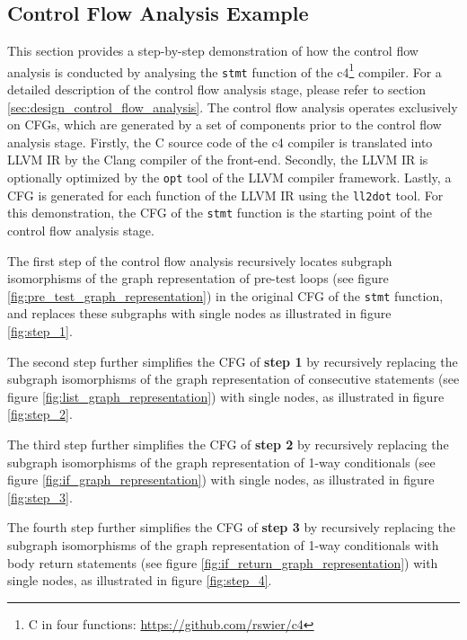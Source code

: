 
\subsection{Control Flow Analysis Example}
\label{app:control_flow_analysis_example}

This section provides a step-by-step demonstration of how the control flow analysis is conducted by analysing the \texttt{stmt} function of the c4\footnote{C in four functions: \url{https://github.com/rswier/c4}} compiler. For a detailed description of the control flow analysis stage, please refer to section \ref{sec:design_control_flow_analysis}. The control flow analysis operates exclusively on CFGs, which are generated by a set of components prior to the control flow analysis stage. Firstly, the C source code of the c4 compiler is translated into LLVM IR by the Clang compiler of the front-end. Secondly, the LLVM IR is optionally optimized by the \texttt{opt} tool of the LLVM compiler framework. Lastly, a CFG is generated for each function of the LLVM IR using the \texttt{ll2dot} tool. For this demonstration, the CFG of the \texttt{stmt} function is the starting point of the control flow analysis stage.

The first step of the control flow analysis recursively locates subgraph isomorphisms of the graph representation of pre-test loops (see figure \ref{fig:pre_test_graph_representation}) in the original CFG of the \texttt{stmt} function, and replaces these subgraphs with single nodes as illustrated in figure \ref{fig:step_1}.

The second step further simplifies the CFG of \textbf{step 1} by recursively replacing the subgraph isomorphisms of the graph representation of consecutive statements (see figure \ref{fig:list_graph_representation}) with single nodes, as illustrated in figure \ref{fig:step_2}.

The third step further simplifies the CFG of \textbf{step 2} by recursively replacing the subgraph isomorphisms of the graph representation of 1-way conditionals (see figure \ref{fig:if_graph_representation}) with single nodes, as illustrated in figure \ref{fig:step_3}.

The fourth step further simplifies the CFG of \textbf{step 3} by recursively replacing the subgraph isomorphisms of the graph representation of 1-way conditionals with body return statements (see figure \ref{fig:if_return_graph_representation}) with single nodes, as illustrated in figure \ref{fig:step_4}.

